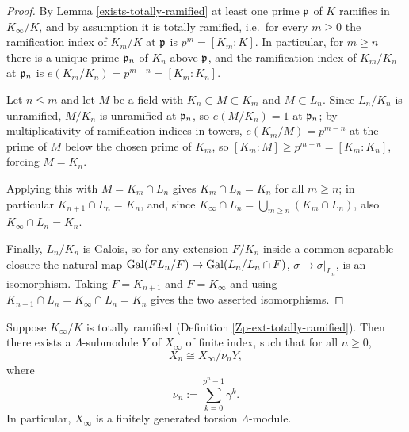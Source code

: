 \begin{proof}
By Lemma \ref{exists-totally-ramified} at least one prime ${\mathfrak{p}}$ of $K$ ramifies
in $K_\infty/K$, and by assumption it is totally ramified, i.e.~for every
$m\geq 0$ the ramification index of $K_m/K$ at ${\mathfrak{p}}$ is $p^m=[K_m:K]$.
In particular, for $m\geq n$ there is a unique prime ${\mathfrak{p}}_n$ of $K_n$ above ${\mathfrak{p}}$,
and the ramification index of $K_m/K_n$ at ${\mathfrak{p}}_n$ is
$e(K_m/K_n)=p^{m-n}=[K_m:K_n]$.

Let $n\leq m$ and let $M$ be a field with $K_n\subset M\subset K_m$ and
$M\subset L_n$. Since $L_n/K_n$ is unramified, $M/K_n$ is unramified at ${\mathfrak{p}}_n$,
so $e(M/K_n)=1$ at ${\mathfrak{p}}_n$; by multiplicativity of ramification indices in
towers, $e(K_m/M)=p^{m-n}$ at the prime of $M$ below the chosen prime of $K_m$,
so $[K_m:M]\geq p^{m-n}=[K_m:K_n]$, forcing $M=K_n$.

Applying this with $M=K_m\cap L_n$ gives $K_m\cap L_n=K_n$ for all $m\geq n$;
in particular $K_{n+1}\cap L_n=K_n$, and, since
$K_\infty\cap L_n=\bigcup_{m\geq n}(K_m\cap L_n)$, also $K_\infty\cap L_n=K_n$.

Finally, $L_n/K_n$ is Galois, so for any extension $F/K_n$ inside a common
separable closure the natural map
${\mathrm{Gal}}(FL_n/F)\to{\mathrm{Gal}}(L_n/L_n\cap F)$, $\sigma\mapsto\sigma|_{L_n}$, is an
isomorphism.
Taking $F=K_{n+1}$ and $F=K_\infty$ and using $K_{n+1}\cap L_n=K_\infty\cap L_n=K_n$
gives the two asserted isomorphisms.
\end{proof}

\begin{thm}
\label{Xn-isom-qout-of-totally-ramified}
Suppose $K_\infty/K$ is totally ramified
(Definition \ref{Zp-ext-totally-ramified}).
Then there exists a $\Lambda$-submodule $Y$ of $X_\infty$ of finite index,
such that for all $n\geq 0$,
$$
X_n\cong X_\infty/\nu_nY,
$$
where
$$
\nu_n:=\sum_{k=0}^{p^n-1}\gamma^k.
$$
In particular, $X_\infty$ is a finitely generated torsion $\Lambda$-module.
\end{thm}

